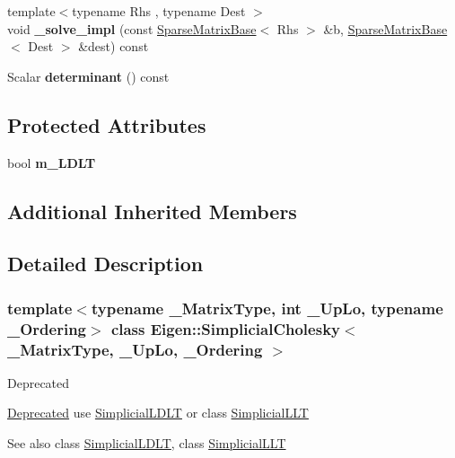 \begin{DoxyCompactItemize}
\item 
\mbox{\label{class_eigen_1_1_simplicial_cholesky_a7e151cd125308b335949babf791fe6e6}} 
{\footnotesize template$<$typename Rhs , typename Dest $>$ }\\void {\bfseries \+\_\+solve\+\_\+impl} (const \mbox{\hyperlink{class_eigen_1_1_sparse_matrix_base}{Sparse\+Matrix\+Base}}$<$ Rhs $>$ \&b, \mbox{\hyperlink{class_eigen_1_1_sparse_matrix_base}{Sparse\+Matrix\+Base}}$<$ Dest $>$ \&dest) const
\item 
\mbox{\label{class_eigen_1_1_simplicial_cholesky_a2cffa2384b8290de34b5a294d4383e70}} 
Scalar {\bfseries determinant} () const
\end{DoxyCompactItemize}
\subsection*{Protected Attributes}
\begin{DoxyCompactItemize}
\item 
\mbox{\label{class_eigen_1_1_simplicial_cholesky_a6439a5ccdf57c278fa2c01202d1e0b35}} 
bool {\bfseries m\+\_\+\+L\+D\+LT}
\end{DoxyCompactItemize}
\subsection*{Additional Inherited Members}


\subsection{Detailed Description}
\subsubsection*{template$<$typename \+\_\+\+Matrix\+Type, int \+\_\+\+Up\+Lo, typename \+\_\+\+Ordering$>$\newline
class Eigen\+::\+Simplicial\+Cholesky$<$ \+\_\+\+Matrix\+Type, \+\_\+\+Up\+Lo, \+\_\+\+Ordering $>$}

\begin{DoxyRefDesc}{Deprecated}
\item[\mbox{\hyperlink{deprecated__deprecated000036}{Deprecated}}]use \mbox{\hyperlink{class_eigen_1_1_simplicial_l_d_l_t}{Simplicial\+L\+D\+LT}} or class \mbox{\hyperlink{class_eigen_1_1_simplicial_l_l_t}{Simplicial\+L\+LT}}\end{DoxyRefDesc}
\begin{DoxySeeAlso}{See also}
class \mbox{\hyperlink{class_eigen_1_1_simplicial_l_d_l_t}{Simplicial\+L\+D\+LT}}, class \mbox{\hyperlink{class_eigen_1_1_simplicial_l_l_t}{Simplicial\+L\+LT}} 
\end{DoxySeeAlso}


